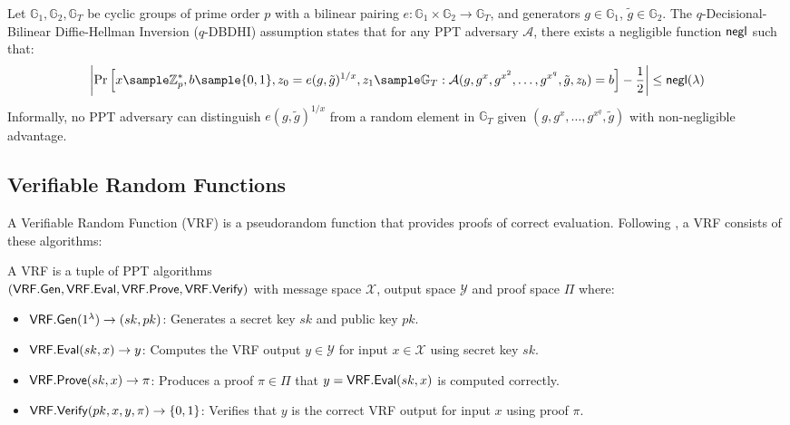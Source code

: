 \begin{definition}
Let $\mathbb{G}_1, \mathbb{G}_2, \mathbb{G}_T$ be cyclic groups of prime order $p$ with a bilinear pairing $e: \mathbb{G}_1 \times \mathbb{G}_2 \to \mathbb{G}_T$, and generators $g \in \mathbb{G}_1$, $\tilde{g} \in \mathbb{G}_2$. The $q$-Decisional-Bilinear Diffie-Hellman Inversion ($q$-DBDHI) assumption states that for any PPT adversary $\mathcal{A}$, there exists a negligible function $\mathsf{negl}$ such that:
\[
\left| \Pr\left[ x \sample \Z_p^*, b \sample \{0,1\}, z_0 = e(g, \tilde{g})^{1/x}, z_1 \sample \G_T : \mathcal{A}(g, g^x, g^{x^2}, \ldots, g^{x^q}, \tilde{g}, z_b) = b \right] - \frac{1}{2}\right| \leq \negl(\lambda)
\]
Informally, no PPT adversary can distinguish $e(g, \tilde{g})^{1/x}$ from a random element in $\mathbb{G}_T$ given $(g, g^x, \ldots, g^{x^q}, \tilde{g})$ with non-negligible advantage.
\end{definition}




\subsection{Verifiable Random Functions}
A Verifiable Random Function (VRF) \cite{micali_verifiable_1999, hutchison_verifiable_2005} is a pseudorandom function that provides proofs of correct evaluation. Following \cite{bitansky_verifiable_2020}, a VRF consists of these algorithms:

\begin{definition}
A VRF is a tuple of PPT algorithms \\
$(\mathsf{VRF.Gen}, \mathsf{VRF.Eval}, \mathsf{VRF.Prove}, \mathsf{VRF.Verify})$ with message space $\mathcal{X}$, output space $\mathcal{Y}$ and proof space $\Pi$ where:
\begin{itemize}
    \item $\mathsf{VRF.Gen}(1^\lambda) \to (sk, pk)$: Generates a secret key $sk$ and public key $pk$.
    \item $\mathsf{VRF.Eval}(sk,x) \to y$: Computes the VRF output $y \in \mathcal{Y}$ for input $x \in \mathcal{X}$ using secret key $sk$.
    \item $\mathsf{VRF.Prove}(sk,x) \to \pi$: Produces a proof $\pi \in \Pi$ that $y = \mathsf{VRF.Eval}(sk,x)$ is computed correctly.
    \item $\mathsf{VRF.Verify}(pk,x,y,\pi) \to \{0,1\}$: Verifies that $y$ is the correct VRF output for input $x$ using proof $\pi$.
\end{itemize}
\end{definition}

